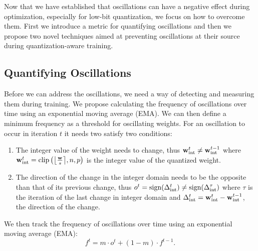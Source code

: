 Now that we have established that oscillations can have a negative effect during optimization, especially for low-bit quantization, we focus on how to overcome them.
First we introduce a metric for quantifying oscillations and then we propose two novel techniques aimed at preventing oscillations at their source during quantization-aware training.  

\subsection{Quantifying Oscillations}
\label{sec:quantifying_oscillations}
Before we can address the oscillations, we need a way of detecting and measuring them during training. We propose calculating the frequency of oscillations over time using an exponential moving average (EMA). We can then define a minimum frequency as a threshold for oscillating weights. 
%
For an oscillation to occur in iteration $t$ it needs two satisfy two conditions: 
\begin{enumerate}
    \item The integer value of the weight needs to change, thus $\mathbf{w}^t_{\text{int}} \neq \mathbf{w}^{t-1}_{\text{int}} $ where $\vec{w}^t_{\INT} =  \text{clip} \left(\round*{\frac{\vec{w}}{\ct{s}}}, \ct{n}, \ct{p}\right)$ is the integer value of the quantized weight.
    \item The direction of the change in the integer domain needs to be the opposite than that of its previous change, thus $o^t = \text{sign}(\Delta^t_{\text{int}}) \neq \text{sign}(\Delta^{\tau}_{\text{int}})$ where $\tau$ is the iteration of the last change in integer domain and $\Delta^t_{\text{int}} = \mathbf{w}^t_{\text{int}} - \mathbf{w}^{t-1}_{\text{int}}$, the direction of the change.
\end{enumerate}
We then track the frequency of oscillations over time using an exponential moving average (EMA):
\begin{equation}
    f^t = m \cdot o^t + (1-m) \cdot f^{t-1}.
    \label{eq:track_oscillations}
\end{equation}

